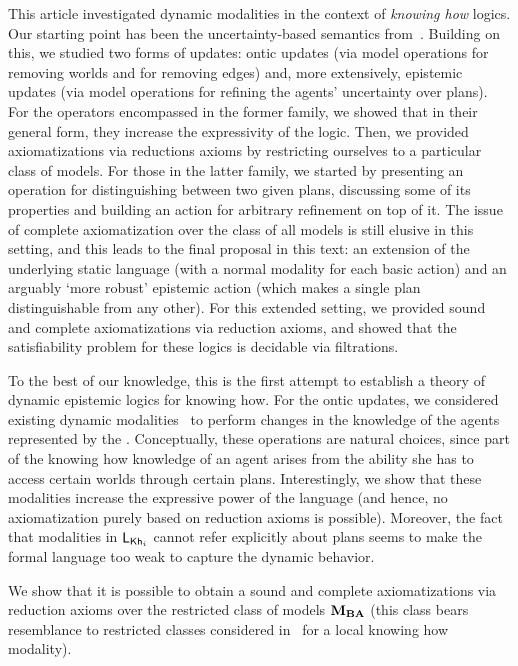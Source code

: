 This article investigated dynamic modalities in the context of \emph{knowing how} logics. Our starting point has been the uncertainty-based semantics from~\cite{AFSVQ21,AFSVQ23report}. 
Building on this, we studied two forms of updates: ontic updates (via model operations for removing worlds and for removing edges) and, more extensively, epistemic updates (via model operations for refining the agents' uncertainty over plans). For the operators encompassed in the former family, we showed that in their general form, they increase the expressivity of the logic. Then, we provided axiomatizations via reductions axioms by restricting ourselves to a particular class of models. For those in the latter family, we started by presenting an operation for distinguishing between two given plans, discussing some of its properties and building an action for arbitrary refinement on top of it. The issue of complete axiomatization over the class of all models is still elusive in this setting, and this leads to the final proposal in this text: an extension of the underlying static language (with a normal modality for each basic action) and an arguably `more robust' epistemic action (which makes a single plan distinguishable from any other). For this extended setting, we provided sound and complete axiomatizations via reduction axioms, and showed that the satisfiability problem for these logics is decidable via filtrations. 

\begin{mrevised}
To the best of our knowledge, this is the first attempt to establish a theory of dynamic epistemic logics for knowing how.  For the ontic updates, we considered existing dynamic modalities~\cite{} to perform changes in the knowledge of the agents represented by the \lts. Conceptually, these operations are natural choices, since part of the knowing how knowledge of an agent arises from the ability she has to access certain worlds through certain plans. Interestingly, we show that these modalities increase the expressive power 
of the language (and hence, no axiomatization purely based on reduction axioms is possible).  Moreover, the fact that modalities in $\mathsf{L}_{{\sf Kh}_i}$ cannot refer explicitly about plans seems to make the formal language too weak to capture the dynamic behavior. 

We show that it is possible to obtain a sound and complete axiomatizations via reduction axioms over the restricted class of models $\mathbf{M}_{\mathbf{BA}}$ (this class bears resemblance to restricted classes considered in~\cite{Li21} for a local knowing how modality). 	
\end{mrevised}

